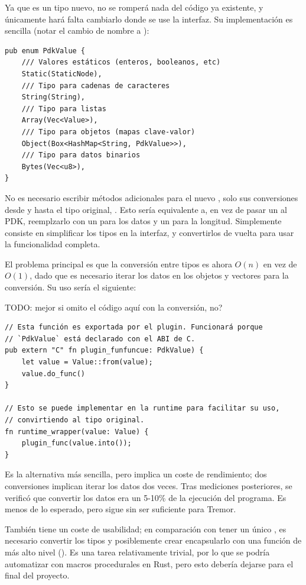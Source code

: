 Ya que es un tipo nuevo, no se romperá nada del código ya existente, y
únicamente hará falta cambiarlo donde se use la interfaz. Su implementación es
sencilla (notar el cambio de nombre a ):

\begin{verbatim}
pub enum PdkValue {
    /// Valores estáticos (enteros, booleanos, etc)
    Static(StaticNode),
    /// Tipo para cadenas de caracteres
    String(String),
    /// Tipo para listas
    Array(Vec<Value>),
    /// Tipo para objetos (mapas clave-valor)
    Object(Box<HashMap<String, PdkValue>>),
    /// Tipo para datos binarios
    Bytes(Vec<u8>),
}
\end{verbatim}

No es necesario escribir métodos adicionales para el nuevo , solo
sus conversiones desde y hasta el tipo original, . Esto sería
equivalente a, en vez de pasar un  al PDK, reemplzarlo con un
 para los datos y un  para la longitud. Simplemente
consiste en simplificar los tipos en la interfaz, y convertirlos de vuelta para
usar la funcionalidad completa.

El problema principal es que la conversión entre tipos es ahora $O(n)$ en vez de
$O(1)$, dado que es necesario iterar los datos en los objetos y vectores para la
conversión. Su uso sería el siguiente:

TODO: mejor si omito el código aquí con la conversión, no?

\begin{verbatim}
// Esta función es exportada por el plugin. Funcionará porque
// `PdkValue` está declarado con el ABI de C.
pub extern "C" fn plugin_funfuncue: PdkValue) {
    let value = Value::from(value);
    value.do_func()
}

// Esto se puede implementar en la runtime para facilitar su uso,
// convirtiendo al tipo original.
fn runtime_wrapper(value: Value) {
    plugin_func(value.into());
}
\end{verbatim}

Es la alternativa más sencilla, pero implica un coste de rendimiento; dos
conversiones implican iterar los datos dos veces. Tras mediciones posteriores,
se verificó que convertir los datos era un 5-10\% de la ejecución del programa.
Es menos de lo esperado, pero sigue sin ser suficiente para Tremor.

También tiene un coste de usabilidad; en comparación con tener un único
, es necesario convertir los tipos y posiblemente crear encapsularlo
con una función de más alto nivel (). Es una tarea
relativamente trivial, por lo que se podría automatizar con macros procedurales
en Rust, pero esto debería dejarse para el final del proyecto.


